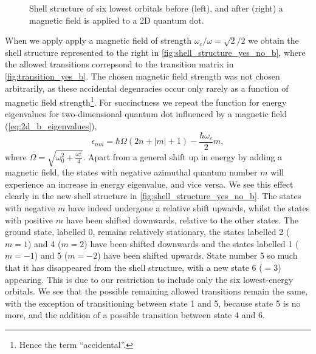 \begin{figure}
\begin{center}
    \end{center} 
    \caption{Shell structure of six lowest orbitals before (left), and after (right)
        a magnetic field is applied to a 2D quantum dot.}
    \label{fig:shell_structure_yes_no_b}
\end{figure}

When we apply apply a magnetic field of strength $\omega_c/\omega = \sqrt{2}/2$ we 
obtain the shell structure represented to the right in 
\autoref{fig:shell_structure_yes_no_b}, where the allowed transitions correpsond to the 
transition matrix in \autoref{fig:transition_yes_b}. The chosen magnetic field strength 
was not chosen arbitrarily, as these accidental degenracies occur only rarely as 
a function of magnetic field strength\footnote{Hence the term ``accidental''.}.
For succinctness we repeat the function for energy eigenvalues for two-dimensional 
quantum dot influenced by a magnetic field (\autoref{eq:2d_b_eigenvalues}),
\begin{equation}
    \epsilon_{nm} = \hbar\Omega(2n + |m| + 1) - \frac{\hbar\omega_c}{2}m,
\end{equation}
where $\Omega = \sqrt{\omega_0^2 + \frac{\omega_c^2}{4}}$.
Apart from a general shift up in energy by adding a magnetic field, the states with 
negative azimuthal quantum number $m$ will experience an increase in energy eigenvalue,
and vice versa. We see this effect clearly in the new shell structure in
\autoref{fig:shell_structure_yes_no_b}. The states with negative $m$ have indeed
undergone a relative shift upwards, whilst the states with positive $m$ have been
shifted downwards, relative to the other states. The ground state, labelled 0, 
remains relatively stationary, the states labelled 2 ($m=1$) and 4 ($m=2$) have been 
shifted downwards and the states labelled 1 ($m=-1$) and 5 ($m=-2$) have been shifted 
upwards. State number 5 so much that it has disappeared from the shell structure, with a 
new state 6 ($=3$) appearing. This is due to our restriction to include only the six
lowest-energy orbitals. We see that the possible remaining allowed transitions remain the 
same, with the exception of transitioning between state 1 and 5, because state 5 is no more,
and the addition of a possible transition between state 4 and 6.

